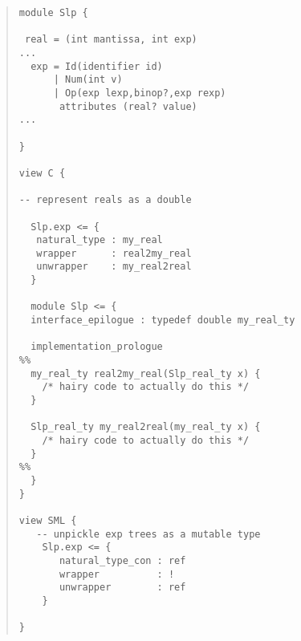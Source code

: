 \begin{quote}\begin{lstlisting}[language=ASDL]
module Slp {

 real = (int mantissa, int exp)
...
  exp = Id(identifier id)
      | Num(int v)
      | Op(exp lexp,binop?,exp rexp)
       attributes (real? value)	
...

}

view C {

-- represent reals as a double

  Slp.exp <= {
   natural_type : my_real
   wrapper      : real2my_real
   unwrapper    : my_real2real
  }
  
  module Slp <= {
  interface_epilogue : typedef double my_real_ty
  
  implementation_prologue
%%
  my_real_ty real2my_real(Slp_real_ty x) {
    /* hairy code to actually do this */
  }

  Slp_real_ty my_real2real(my_real_ty x) {
    /* hairy code to actually do this */
  }
%% 
  } 
}

view SML {
   -- unpickle exp trees as a mutable type
    Slp.exp <= {
       natural_type_con : ref
       wrapper          : !
       unwrapper        : ref
    }

}
\end{lstlisting}\end{quote}%

